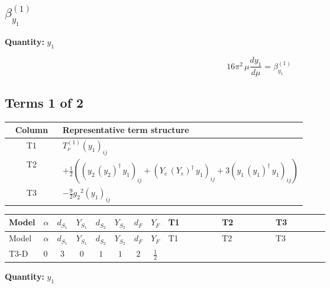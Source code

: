 \documentclass[8pt]{article}
\begin{document}
\begin{landscape}
\section*{$\beta_{y_1}^{(1)}$}
\noindent\textbf{Quantity: }$y_1$\par\smallskip
\[16\pi^2\,\mu\frac{d y_1}{d\mu}=\beta_{y_1}^{(1)}\]
\subsection*{Terms 1 of 2}
\begin{center}
\begin{tabular}{@{}c >{\raggedright\arraybackslash}p{0.82\linewidth}@{}}
\toprule
Column & Representative term structure \\
\midrule
T1 & \(\displaystyle T_{\nu}^{(1)} \left({y_1}\right)_{ij}\) \\
\midrule
T2 & \(\displaystyle +\frac{1}{2} (\left({y_2}\,\left({y_2}\right)^{\dagger}\,{y_1}\right)_{ij}+\left({Y_e}\,\left({Y_e}\right)^{\dagger}\,{y_1}\right)_{ij}+3 \left({y_1}\,\left({y_1}\right)^{\dagger}\,{y_1}\right)_{ij})\) \\
\midrule
T3 & \(\displaystyle -\frac{9}{2} {g_2}^2 \left({y_1}\right)_{ij}\) \\
\midrule
\bottomrule
\end{tabular}
\end{center}
\smallskip
\tiny
\begin{longtable}{@{}llcccccc >{\raggedright\arraybackslash}p{0.21\linewidth} >{\raggedright\arraybackslash}p{0.21\linewidth} >{\raggedright\arraybackslash}p{0.21\linewidth}@{}}
\toprule
Model & $\alpha$ & $d_{S_1}$ & $Y_{S_1}$ & $d_{S_2}$ & $Y_{S_2}$ & $d_F$ & $Y_F$ & T1 & T2 & T3 \\
\midrule
\endfirsthead
\toprule
Model & $\alpha$ & $d_{S_1}$ & $Y_{S_1}$ & $d_{S_2}$ & $Y_{S_2}$ & $d_F$ & $Y_F$ & T1 & T2 & T3 \\
\midrule
\endhead
T3-D & $0$ & $3$ & $0$ & $1$ & $1$ & $2$ & $\frac{1}{2}$ & \scriptsize\adjustbox{max width=\linewidth}{$\begin{gathered} T_{\nu}^{(1)} \left({y_1}\right)_{ij}\end{gathered}$} & \scriptsize\adjustbox{max width=\linewidth}{$\begin{gathered} +\frac{1}{2} (\left({y_2}\,\left({y_2}\right)^{\dagger}\,{y_1}\right)_{ij}+\left({Y_e}\,\left({Y_e}\right)^{\dagger}\,{y_1}\right)_{ij}+3 \left({y_1}\,\left({y_1}\right)^{\dagger}\,{y_1}\right)_{ij})\end{gathered}$} & \scriptsize\adjustbox{max width=\linewidth}{$\begin{gathered} -\frac{9}{2} {g_2}^2 \left({y_1}\right)_{ij}\end{gathered}$} \\
\midrule
\bottomrule
\end{longtable}
\clearpage
\noindent\textbf{Quantity: }$y_1$\par\smallskip

\end{landscape}
\end{document}
